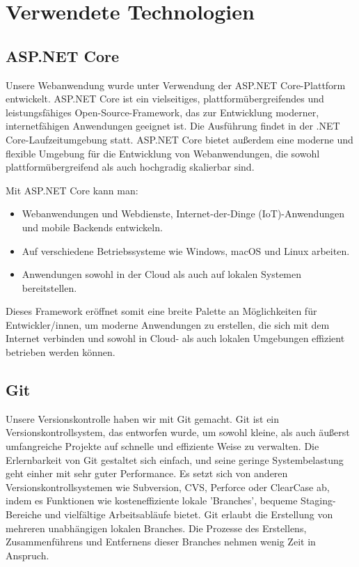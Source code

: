 \section{Verwendete Technologien}
\label{sec:tech}

\subsection*{ASP.NET Core}

Unsere Webanwendung wurde unter Verwendung der ASP.NET Core-Plattform entwickelt. 
ASP.NET Core ist ein vielseitiges, plattformübergreifendes und leistungsfähiges 
Open-Source-Framework, das zur Entwicklung moderner, internetfähigen Anwendungen geeignet ist. 
Die Ausführung findet in der .NET Core-Laufzeitumgebung statt.
ASP.NET Core bietet außerdem eine moderne und flexible Umgebung für die Entwicklung von Webanwendungen, 
die sowohl plattformübergreifend als auch hochgradig skalierbar sind. \cite{asp_dotnetcore}

Mit ASP.NET Core kann man:

\begin{itemize}

\item Webanwendungen und Webdienste, Internet-der-Dinge (IoT)-Anwendungen und 
mobile Backends entwickeln.
\item Auf verschiedene Betriebssysteme wie Windows, macOS und Linux arbeiten.
\item Anwendungen sowohl in der Cloud als auch auf lokalen Systemen bereitstellen.
\end{itemize}

Dieses Framework eröffnet somit eine breite Palette an Möglichkeiten für Entwickler/innen, 
um moderne Anwendungen zu erstellen, die sich mit dem Internet verbinden und 
sowohl in Cloud- als auch lokalen Umgebungen effizient betrieben werden können. \cite{asp_dotnetcore}
\newpage

\subsection*{Git}

Unsere Versionskontrolle haben wir mit Git gemacht. Git ist ein Versionskontrollsystem, 
das entworfen wurde, um sowohl kleine, als auch äußerst 
umfangreiche Projekte auf schnelle und effiziente Weise zu verwalten.
Die Erlernbarkeit von Git gestaltet sich einfach, und seine geringe Systembelastung 
geht einher mit sehr guter Performance. Es setzt sich von anderen Versionskontrollsystemen 
wie Subversion, CVS, Perforce oder ClearCase ab, indem es Funktionen wie kosteneffiziente 
lokale 'Branches', bequeme Staging-Bereiche und vielfältige Arbeitsabläufe bietet.
Git erlaubt die Erstellung von mehreren unabhängigen lokalen Branches. 
Die Prozesse des Erstellens, Zusammenführens und Entfernens dieser Branches 
nehmen wenig Zeit in Anspruch. \cite{git_introduction} \\

